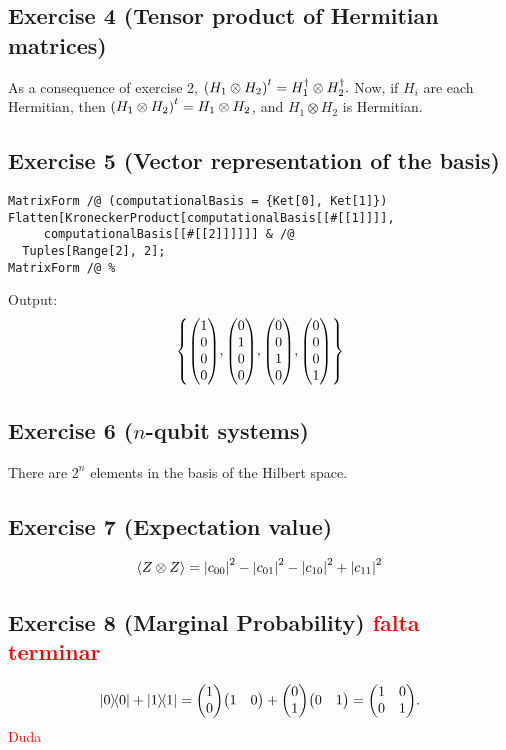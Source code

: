 \subsection{Exercise 4 (Tensor product of Hermitian matrices)}
As a consequence of exercise 2,
$\qty(H_1\otimes H_2)^t=H_1^{\dagger}\otimes H_2^{\dagger}.$
Now, if $H_i$ are each Hermitian, then $\qty(H_1\otimes H_2)^t
=H_1\otimes H_2$, and $H_1\otimes H_2$ is Hermitian.

\subsection{Exercise 5 (Vector representation of the basis)}
\begin{verbatim}
MatrixForm /@ (computationalBasis = {Ket[0], Ket[1]})
Flatten[KroneckerProduct[computationalBasis[[#[[1]]]], 
     computationalBasis[[#[[2]]]]]] & /@
  Tuples[Range[2], 2];
MatrixForm /@ %
\end{verbatim}
Output:
\begin{align}
\qty{\mqty(1\\0\\0\\0),\mqty(0\\1\\0\\0),\mqty(0\\0\\1\\0),\mqty(0\\0\\0\\1)}
\end{align}

\subsection{Exercise 6 ($n$-qubit systems)}\noindent
There are $2^n$ elements in the basis of the Hilbert space.

\subsection{Exercise 7 (Expectation value)}
\begin{align}
\expval{Z\otimes Z}=\abs{c_{00}}^2-\abs{c_{01}}^2-\abs{c_{10}}^2+\abs{c_{11}}^2
\end{align}

\subsection{Exercise 8 (Marginal Probability) \textcolor{red}{falta terminar}}
\begin{align}
\dyad{0}{0}+\dyad{1}{1}=\mqty(1\\0)\mqty(1&0)+\mqty(0\\1)\mqty(0&1)
=\mqty(1&0\\0&1).
\end{align}
\textcolor{red}{Duda}

